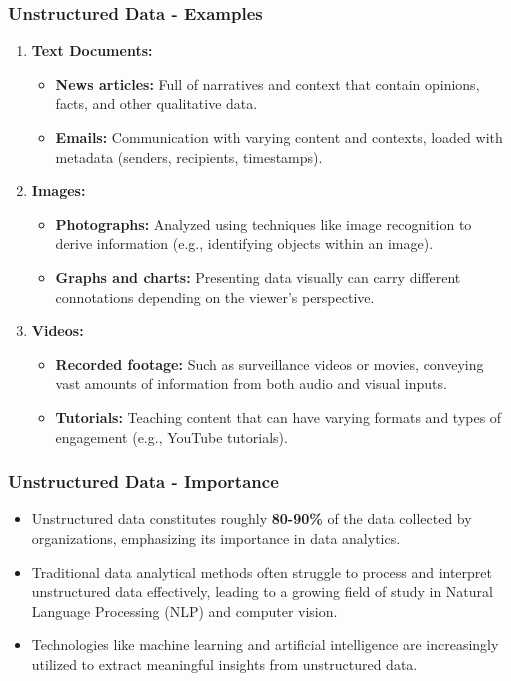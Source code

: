 \documentclass{beamer}
\begin{document}
\begin{frame}[fragile]
    \frametitle{Unstructured Data - Examples}
    \begin{enumerate}
        \item \textbf{Text Documents:}
        \begin{itemize}
            \item \textbf{News articles:} Full of narratives and context that contain opinions, facts, and other qualitative data.
            \item \textbf{Emails:} Communication with varying content and contexts, loaded with metadata (senders, recipients, timestamps).
        \end{itemize}

        \item \textbf{Images:}
        \begin{itemize}
            \item \textbf{Photographs:} Analyzed using techniques like image recognition to derive information (e.g., identifying objects within an image).
            \item \textbf{Graphs and charts:} Presenting data visually can carry different connotations depending on the viewer’s perspective.
        \end{itemize}

        \item \textbf{Videos:}
        \begin{itemize}
            \item \textbf{Recorded footage:} Such as surveillance videos or movies, conveying vast amounts of information from both audio and visual inputs.
            \item \textbf{Tutorials:} Teaching content that can have varying formats and types of engagement (e.g., YouTube tutorials).
        \end{itemize}
    \end{enumerate}
\end{frame}

\begin{frame}[fragile]
    \frametitle{Unstructured Data - Importance}
    \begin{itemize}
        \item Unstructured data constitutes roughly \textbf{80-90\%} of the data collected by organizations, emphasizing its importance in data analytics.
        \item Traditional data analytical methods often struggle to process and interpret unstructured data effectively, leading to a growing field of study in Natural Language Processing (NLP) and computer vision.
        \item Technologies like machine learning and artificial intelligence are increasingly utilized to extract meaningful insights from unstructured data.
    \end{itemize}
\end{frame}
\end{document}
